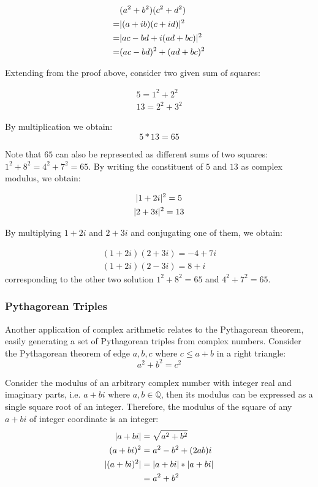 \documentclass[12pt]{article}
\begin{document}
	\begin{align*}
		  & (a^2 + b^2)(c^2 + d^2) \\
		= & \lvert (a + ib)(c + id) \rvert^2 \\
		= & \lvert ac - bd + i(ad + bc) \rvert^2 \\
		= & (ac - bd)^2 + (ad + bc)^2
	\end{align*}
	 
	Extending from the proof above, consider two given sum of squares:
	
	\begin{gather*}
		5 = 1^2 + 2^2 \\
		13 = 2^2 + 3^2
	\end{gather*}
	
	By multiplication we obtain: $$5 * 13 = 65$$
	
	Note that $65$ can also be represented as different sums of two squares: $1^2 + 8^2 = 4^2 + 7^2 = 65$. By writing the constituent of $5$ and $13$ as complex modulus, we obtain:
	
	\begin{gather*}
		\lvert 1 + 2i \rvert^2 = 5 \\
		\lvert 2 + 3i \rvert^2 = 13
	\end{gather*}
	
	By multiplying $1 + 2i$ and $2 + 3i$ and conjugating one of them, we obtain:
	
	\begin{gather*}
		(1 + 2i)(2 + 3i) = -4 + 7i \\
		(1 + 2i)(2 - 3i) = 8 + i
	\end{gather*}
	corresponding to the other two solution $1^2 + 8^2 = 65$ and $4^2 + 7^2 = 65$.
	
	\subsubsection{Pythagorean Triples}
	
	Another application of complex arithmetic relates to the Pythagorean theorem, easily generating a set of Pythagorean triples from complex numbers. Consider the Pythagorean theorem of edge $a, b, c$ where $c \leq a + b$ in a right triangle: $$a^2 + b^2 = c^2$$
	
	Consider the modulus of an arbitrary complex number with integer real and imaginary parts, i.e. $a + bi$ where $a, b \in \mathbb{Q}$, then its modulus can be expressed as a single square root of an integer. Therefore, the modulus of the square of any $a + bi$ of integer coordinate is an integer:
	\begin{align*}
		\lvert a + bi \rvert &= \sqrt{a^2 + b^2} \\
		(a + bi)^2 &= a^2 - b^2 + (2ab)i  \\
		\lvert (a + bi)^2 \rvert &= \lvert a + bi \rvert * \lvert a + bi \rvert \\
		& = a^2 + b^2
	\end{align*}
	
\end{document}
